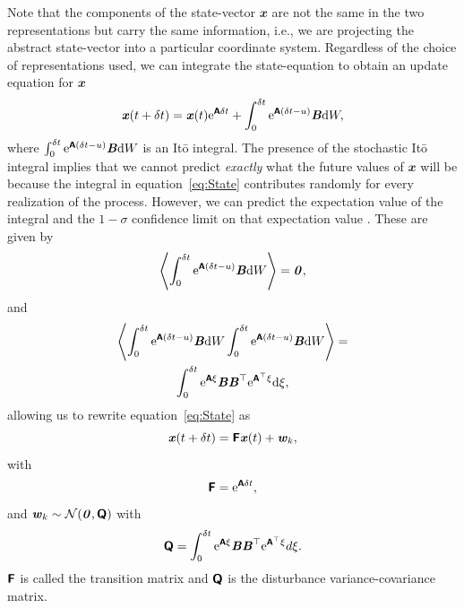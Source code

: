 \documentclass[a4paper,fleqn,usenatbib]{mnras}
\begin{document}
Note that the components of the state-vector $\mathbfit{x}$ are not the same in the two representations but carry the same information, i.e., we are projecting the abstract state-vector into a particular coordinate system. Regardless of the choice of representations used, we can integrate the state-equation \citep{DimensionEstimationBrockwell,Oksendal} to obtain an update equation for $\mathbfit{x}$
\begin{equation}\label{eq:State}
\textbf{\textit{x}}(t + \delta t) = \textbf{\textit{x}}(t)\mathrm{e}^{\textbf{\textsf{A}}\delta t} + \int_{0}^{\delta t} \mathrm{e}^{\textbf{\textsf{A}}(\delta t-u)}\textbf{\textit{B}} \mathrm{d}W,
\end{equation}
where $\int_{0}^{\delta t} \mathrm{e}^{\textbf{\textsf{A}}(\delta t-u)}\textbf{\textit{B}} \mathrm{d}W$ is an It\={o} integral. The presence of the stochastic It\={o} integral implies that we cannot predict \textit{exactly} what the future values of $\mathbfit{x}$ will be because the integral in equation~\eqref{eq:State} contributes randomly for every realization of the process. However, we can predict the expectation value of the integral and the $1-\sigma$ confidence limit on that expectation value \citep[chapter 6]{Davis}. These are given by
\begin{equation}\label{eq:ExpVal}
\left\langle \int_{0}^{\delta t} \mathrm{e}^{\textbf{\textsf{A}}(\delta t-u)}\textbf{\textit{B}} \mathrm{d}W \right\rangle = \textbf{\textit{0}},
\end{equation}
and
\begin{multline}\label{eq:CovVal}
\left\langle \int_{0}^{\delta t} \mathrm{e}^{\textbf{\textsf{A}}(\delta t-u)}\textbf{\textit{B}} \mathrm{d}W \int_{0}^{\delta t} \mathrm{e}^{\textbf{\textsf{A}}(\delta t-u)}\textbf{\textit{B}} \mathrm{d}W \right\rangle = \\ \int_{0}^{\delta t} \mathrm{e}^{\textbf{\textsf{A}}\xi}\textbf{\textit{B}}\textbf{\textit{B}}^{\top}\mathrm{e}^{\textbf{\textsf{A}}^{\top}\xi} \mathrm{d}\xi,
\end{multline}
allowing us to rewrite equation~\ref{eq:State} as
\begin{equation}\label{eq:IntegratedState}
\textbf{\textit{x}}(t + \delta t) = \textbf{\textsf{F}}\textbf{\textit{x}}(t) + \textbf{\textit{w}}_{k},
\end{equation}
with \begin{equation}\label{eq:TransMat}
\textbf{\textsf{F}} = \mathrm{e}^{\textbf{\textsf{A}}\delta t},
\end{equation}
and $\textbf{\textit{w}}_{k} \sim \mathcal{N}(\textbf{\textit{0}},\textbf{\textsf{Q}})$ with
\begin{equation}\label{eq:DistMat}
\textbf{\textsf{Q}} = \int_{0}^{\delta t} \mathrm{e}^{\textbf{\textsf{A}}\xi}\textbf{\textit{B}}\textbf{\textit{B}}^{\top}\mathrm{e}^{\textbf{\textsf{A}}^{\top}\xi} d\xi.
\end{equation}
$\textbf{\textsf{F}}$ is called the transition matrix and $\textbf{\textsf{Q}}$ is the disturbance variance-covariance matrix.
\end{document}
